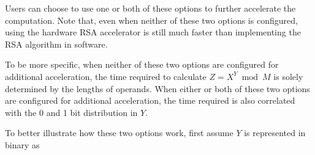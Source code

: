\documentclass[main\_\_EN.tex]{subfiles}
\begin{document}
Users can choose to use one or both of these options to further accelerate the computation. Note that, even when neither of these two options is configured, using the hardware RSA accelerator is still much faster than implementing the RSA algorithm in software.

To be more specific, when neither of these two options are configured for additional acceleration, the time required to calculate \begin{math}Z = X^{Y} \bmod M\end{math} is solely determined by the lengths of operands.  When either or both of these two options are configured for additional acceleration, the time required is also correlated with the 0 and 1 bit distribution in \begin{math}Y\end{math}.

To better illustrate how these two options work, first assume \begin{math}Y \end{math} is represented in binary as
\end{document}
